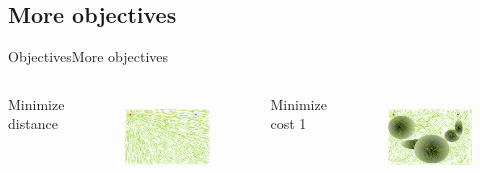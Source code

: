 \subsection{More objectives}

\begin{frame}{Objectives}{More objectives}
\begin{columns}
	{ Minimize distance}
	\begin{figure}
		\centering
		\includegraphics[width=\linewidth]{figure/sim7-3obj/MORRTstar02-0.png}
		\label{fig:sim:03:prob1}
	\end{figure}
	{ Minimize cost 1}
	\begin{figure}
		\centering
		\includegraphics[width=\linewidth]{figure/sim7-3obj/MORRTstar02-1.png}
		\label{fig:sim:03:prob2}
	\end{figure}

\end{columns}
\end{frame}
